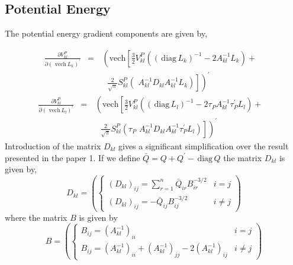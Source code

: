 \documentclass[12pt,thmsa]{article}
\begin{document}
\subsection{Potential Energy}

The potential energy gradient components are given by,

\begin{eqnarray}
\frac{\partial V_{kl}^P}{\partial \left( \,\,\mathrm{vech}\,L_k\right)
^{\prime }} &=&\,\left( \mathrm{vech}\left[ \frac 32V_{kl}^P\left( \left( \,%
\mathrm{diag}\,L_k\right) ^{-1}-2A_{kl}^{-1}L_k\right) + 
\begin{array}{c}
\end{array}
\right. \right.  \nonumber \\
&&\left. \left. 
\begin{array}{c}
\end{array}
\frac 2{\sqrt{\pi }}S_{kl}^P\left(
\,\,A_{kl}^{-1}D_{kl}A_{kl}^{-1}L_k\right) \right] \right) ^{\prime }
\end{eqnarray}
\begin{eqnarray}
\frac{\partial V_{kl}^P}{\partial \left( \,\,\mathrm{vech}\,L_l\right)
^{\prime }} &=&\,\left( \mathrm{vech}\left[ \frac 32V_{kl}^P\left( \left( \,%
\mathrm{diag}\,L_l\right) ^{-1}-2\tau _PA_{kl}^{-1}\tau _P^{\prime
}L_l\right) + 
\begin{array}{c}
\end{array}
\right. \right.  \nonumber \\
&&\left. \left. 
\begin{array}{c}
\end{array}
\frac 2{\sqrt{\pi }}S_{kl}^P\left( \tau
_P\,\,A_{kl}^{-1}D_{kl}A_{kl}^{-1}\tau _P^{\prime }L_l\right) \right]
\right) ^{\prime }
\end{eqnarray}
Introduction of the matrix $D_{kl}$ gives a significant simplification over
the result presented in the paper 1. If we define $\bar{Q}=Q+Q^{\prime }-\,%
\mathrm{diag}\,Q$ the matrix $D_{kl}$ is given by, 
\begin{equation}
D_{kl}=\left( \left\{ 
\begin{array}{ll}
\left( D_{kl}\right) _{ij}=\sum_{r=1}^n\bar{Q}_{ir}B_{ir}^{-3/2} & i=j \\ 
\left( D_{kl}\right) _{ij}=-\bar{Q}_{ij}B_{ij}^{-3/2} & i\neq j
\end{array}
\right. \right)
\end{equation}
where the matrix $B$ is given by 
\begin{equation}
B=\left( \left\{ 
\begin{array}{ll}
B_{ij}=\left( A_{kl}^{-1}\right) _{ii} & i=j \\ 
B_{ij}=\left( A_{kl}^{-1}\right) _{ii}+\left( A_{kl}^{-1}\right)
_{jj}-2\left( A_{kl}^{-1}\right) _{ij} & i\neq j
\end{array}
\right. \right)
\end{equation}
\end{document}
